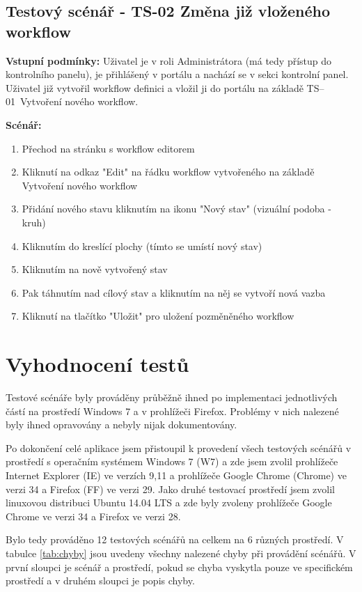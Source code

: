 \documentclass{fithesis}
\begin{document}
\subsection*{Testový scénář - TS-02 Změna již vloženého workflow}
 

\textbf{Vstupní podmínky:} Uživatel je v roli Administrátora (má tedy přístup do kontrolního panelu), je přihlášený v portálu a nachází se v sekci kontrolní panel. Uživatel již vytvořil workflow definici a vložil ji do portálu na základě TS--01~Vytvoření nového workflow.

\textbf{Scénář:}
\begin{enumerate}
\item Přechod na stránku s workflow editorem
\item Kliknutí na odkaz "Edit" na řádku workflow vytvořeného na základě Vytvoření nového workflow
\item Přidání nového stavu kliknutím na ikonu "Nový stav" (vizuální podoba - kruh)
\item Kliknutím do kreslící plochy (tímto se umístí nový stav)
\item Kliknutím na nově vytvořený stav 
\item Pak táhnutím nad cílový stav a kliknutím na něj se vytvoří nová vazba
\item Kliknutí na tlačítko "Uložit" pro uložení pozměněného workflow

\end{enumerate}


\section{Vyhodnocení testů}
Testové scénáře byly prováděny průběžně ihned po implementaci jednotlivých částí na prostředí Windows 7 a v prohlížeči Firefox. Problémy v nich nalezené byly ihned opravovány a nebyly nijak dokumentovány.

Po dokončení celé aplikace jsem přistoupil k provedení všech testových scénářů v prostředí s  operačním systémem Windows 7 (W7) a zde jsem zvolil prohlížeče Internet Explorer (IE) ve verzích 9,11 a prohlížeče Google Chrome (Chrome) ve verzi 34 a Firefox (FF) ve verzi 29. Jako druhé testovací prostředí jsem zvolil linuxovou distribuci Ubuntu 14.04 LTS a zde byly zvoleny prohlížeče Google Chrome ve verzi 34 a Firefox ve verzi 28.

Bylo tedy prováděno 12 testových scénářů na celkem na 6 různých prostředí. V tabulce  \ref{tab:chyby} jsou uvedeny všechny nalezené chyby při provádění scénářů. V první sloupci je scénář a prostředí, pokud se chyba vyskytla pouze ve specifickém prostředí a v druhém sloupci je popis chyby.
\end{document}
